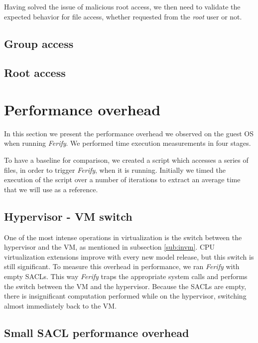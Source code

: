 \par Having solved the issue of malicious root access, we then need to validate the expected behavior for file access, whether requested from the \emph{root} user or not.

\subsection{Group access}


\subsection{Root access}




\section{Performance overhead}\label{sec:performance}

In this section we present the performance overhead we observed on the guest \ac{OS} when running \emph{Ferify}. We performed time execution measurements in four stages. 

\par To have a baseline for comparison, we created a script which accesses a series of files, in order to trigger \emph{Ferify}, when it is running. Initially we timed the execution of the script over a number of iterations to extract an average time that we will use as a reference.

\subsection{Hypervisor - \ac{VM} switch}

\par One of the most intense operations in virtualization is the switch between the hypervisor and the \ac{VM}, as mentioned in subsection \ref{sub:invm}. \ac{CPU} virtualization extensions improve with every new model release, but this switch is still significant. To measure this overhead in performance, we ran \emph{Ferify} with empty \acp{SACL}. This way \emph{Ferify} traps the appropriate system calls and performs the switch between the \ac{VM} and the hypervisor. Because the \acp{SACL} are empty, there is insignificant computation performed while on the hypervisor, switching almost immediately back to the \ac{VM}. 


\subsection{Small \ac{SACL} performance overhead}

